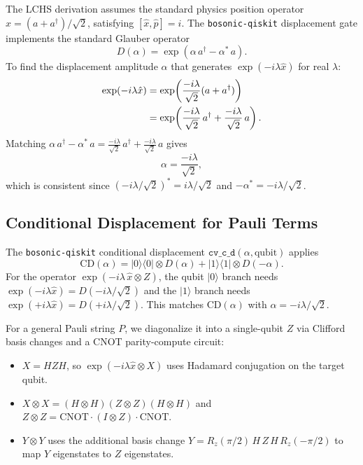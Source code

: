 \documentclass[11pt]{article}
\begin{document}
The LCHS derivation assumes the standard physics position operator
$\hat{x} = (a+a^\dagger)/\sqrt{2}$, satisfying $[\hat{x},\hat{p}]=i$.
The \texttt{bosonic-qiskit} displacement gate implements the standard
Glauber operator
\begin{equation}
  D(\alpha) = \exp(\alpha\, a^\dagger - \alpha^*\, a).
\end{equation}
To find the displacement amplitude $\alpha$ that generates
$\exp(-i\lambda\hat{x})$ for real $\lambda$:
\begin{align}
  \exp(-i\lambda\hat{x})
  &= \exp\!\left(\frac{-i\lambda}{\sqrt{2}}(a + a^\dagger)\right) \notag\\
  &= \exp\!\left(\frac{-i\lambda}{\sqrt{2}}\,a^\dagger
    + \frac{-i\lambda}{\sqrt{2}}\,a\right).
\end{align}
Matching $\alpha\,a^\dagger - \alpha^*\,a
= \tfrac{-i\lambda}{\sqrt{2}}\,a^\dagger + \tfrac{-i\lambda}{\sqrt{2}}\,a$
gives
\begin{equation}\label{eq:disp-alpha}
  \boxed{\alpha = \frac{-i\lambda}{\sqrt{2}},}
\end{equation}
which is consistent since $(-i\lambda/\sqrt{2})^* = i\lambda/\sqrt{2}$
and $-\alpha^* = -i\lambda/\sqrt{2}$.

\subsection{Conditional Displacement for Pauli Terms}

The \texttt{bosonic-qiskit} conditional displacement
$\texttt{cv\_c\_d}(\alpha, \text{qubit})$ applies
\begin{equation}
  \mathrm{CD}(\alpha) = |0\rangle\!\langle 0|\otimes D(\alpha)
  + |1\rangle\!\langle 1|\otimes D(-\alpha).
\end{equation}
For the operator $\exp(-i\lambda\,\hat{x}\otimes Z)$, the qubit $|0\rangle$
branch needs $\exp(-i\lambda\hat{x}) = D(-i\lambda/\sqrt{2})$ and
the $|1\rangle$ branch needs $\exp(+i\lambda\hat{x}) = D(+i\lambda/\sqrt{2})$.
This matches $\mathrm{CD}(\alpha)$ with $\alpha = -i\lambda/\sqrt{2}$.

For a general Pauli string $P$, we diagonalize it into a single-qubit $Z$
via Clifford basis changes and a CNOT parity-compute circuit:
\begin{itemize}[itemsep=2pt]
  \item $X = H Z H$, so $\exp(-i\lambda\hat{x}\otimes X)$ uses Hadamard
        conjugation on the target qubit.
  \item $X\otimes X = (H\otimes H)(Z\otimes Z)(H\otimes H)$ and
        $Z\otimes Z = \mathrm{CNOT}\cdot(I\otimes Z)\cdot\mathrm{CNOT}$.
  \item $Y\otimes Y$ uses the additional basis change
        $Y = R_z(\pi/2)\,H\,Z\,H\,R_z(-\pi/2)$ to map $Y$ eigenstates
        to $Z$ eigenstates.
\end{itemize}
\end{document}
